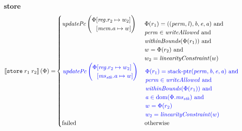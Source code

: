 \documentclass[a3paper]{article}
\newcommand{\sem}[1]{\left\llbracket #1 \right\rrbracket}
\newcommand{\dom}{\mathrm{dom}}
\newcommand{\tand}{\text{ and }}
\newcommand{\totherwise}{\text{otherwise }}
\newcommand{\sourcecolor}{\color{blue}}
\newcommand{\targetcolor}[1]{\color{black}}
\newcommand{\trg}[1]{{\targetcolor{} #1}}
\newcommand{\zinstr}[1]{\texttt{#1}}
\newcommand{\twoinstr}[3]{
  \ifthenelse{\equal{#2#3}{}}
  {\zinstr{#1}}
  {\zinstr{#1} \; #2 \; #3}
}
\newcommand{\tstore}[2]{\twoinstr{\trg{store}}{#1}{#2}}
\newcommand{\update}[2]{[#1 \mapsto #2]}
\newcommand{\updReg}[2]{\update{\reg.#1}{#2}}
\newcommand{\perm}{\var{perm}}
\newcommand{\lin}{\var{l}}
\newcommand{\stkptr}[1]{\mathrm{stack\text{-}ptr}(#1)}
\newcommand{\failed}{\mathrm{failed}}
\newcommand{\var}[1]{\mathit{#1}}
\newcommand{\reg}{\var{reg}}
\newcommand{\mem}{\var{mem}}
\newcommand{\ms}{\var{ms}}
\newcommand{\stk}{\var{stk}}
\newcommand{\baddr}{\var{b}}
\newcommand{\eaddr}{\var{e}}
\newcommand{\aaddr}{\var{a}}
\newcommand{\plainfun}[2]{
  \ifthenelse{\equal{#2}{}}
  {\mathit{#1}}
  {\mathit{#1}(#2)}
}
\newcommand{\linCons}[1]{\plainfun{linearityConstraint}{#1}}
\newcommand{\updPcAddr}[1]{\plainfun{updatePc}{#1}}
\newcommand{\withinBounds}[1]{\plainfun{withinBounds}{#1}}
\newcommand{\writeAllowed}[1]{\plainfun{writeAllowed}{#1}}
\begin{document}
\noindent\textbf{store}\\
\begin{align*}
  \sem{\tstore{r_1}{r_2}}(\Phi) = &
                                    \begin{cases}
                                      \updPcAddr{}\left(
                                        \arraycolsep=0pt
                                        \begin{array}{rl}
                                          \Phi&\updReg{r_2}{w_2}\\
                                              &\update{\mem.a}{w}
                                        \end{array}
\right) & 
                                      \arraycolsep=0pt
                                      \begin{array}[t]{l}
                                        \Phi(r_1) = ((\perm,\lin),\baddr,\eaddr,\aaddr) \tand \\
                                        \perm \in \writeAllowed{} \tand\\
                                        \withinBounds{\Phi(r_1)} \tand \\
                                        w = \Phi(r_2) \tand \\
                                        w_2 = \linCons{w}
                                      \end{array}
                                      \\
                                      \sourcecolor\left.
                                      \updPcAddr{}\left(
                                      \arraycolsep=0pt
                                      \begin{array}{rl}
                                        \Phi&\updReg{r_2}{w_2}\\
                                            &\update{\ms_\stk.a}{w}
                                      \end{array}
                                      \right) \right.& 
                                      \sourcecolor\left.
                                      \arraycolsep=0pt
                                      \begin{array}[t]{l}
                                        \Phi(r_1) = \stkptr{\perm,\baddr,\eaddr,\aaddr} \tand \\
                                        \perm \in \writeAllowed{} \tand \\
                                        \withinBounds{\Phi(r_1)} \tand \\
                                        \aaddr \in \dom(\Phi.\ms_\stk) \tand \\
                                        w = \Phi(r_2) \\
                                        w_2 = \linCons{w}
                                      \end{array}\right.\\
                                      \failed & \totherwise
                                    \end{cases}
\end{align*}
\end{document}

